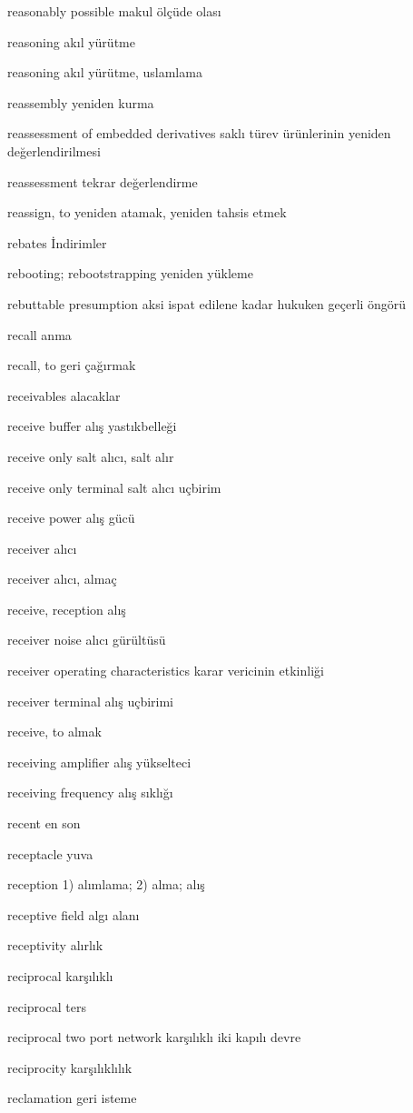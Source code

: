 \documentclass[12pt,fleqn]{article}\usepackage{../../common}
\begin{document}
reasonably possible makul ölçüde olası

reasoning akıl yürütme

reasoning akıl yürütme, uslamlama

reassembly yeniden kurma

reassessment of embedded derivatives saklı türev ürünlerinin yeniden değerlendirilmesi

reassessment tekrar değerlendirme

reassign, to yeniden atamak, yeniden tahsis etmek

rebates İndirimler

rebooting; rebootstrapping yeniden yükleme

rebuttable presumption aksi ispat edilene kadar hukuken geçerli öngörü

recall anma

recall, to geri çağırmak

receivables alacaklar

receive buffer alış yastıkbelleği

receive only salt alıcı, salt alır

receive only terminal salt alıcı uçbirim

receive power alış gücü

receiver alıcı

receiver alıcı, almaç

receive, reception alış

receiver noise alıcı gürültüsü

receiver operating characteristics karar vericinin etkinliği

receiver terminal alış uçbirimi

receive, to almak

receiving amplifier alış yükselteci

receiving frequency alış sıklığı

recent en son

receptacle yuva

reception 1) alımlama; 2) alma; alış

receptive field algı alanı

receptivity alırlık

reciprocal karşılıklı

reciprocal ters

reciprocal two port network karşılıklı iki kapılı devre

reciprocity karşılıklılık

reclamation geri isteme
\end{document}
